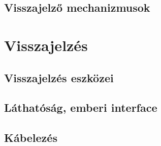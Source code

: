 \subsection{Visszajelző mechanizmusok}


\section{Visszajelzés}

\subsection{Visszajelzés eszközei}

\subsection{Láthatóság, emberi interface}

\subsection{Kábelezés}
